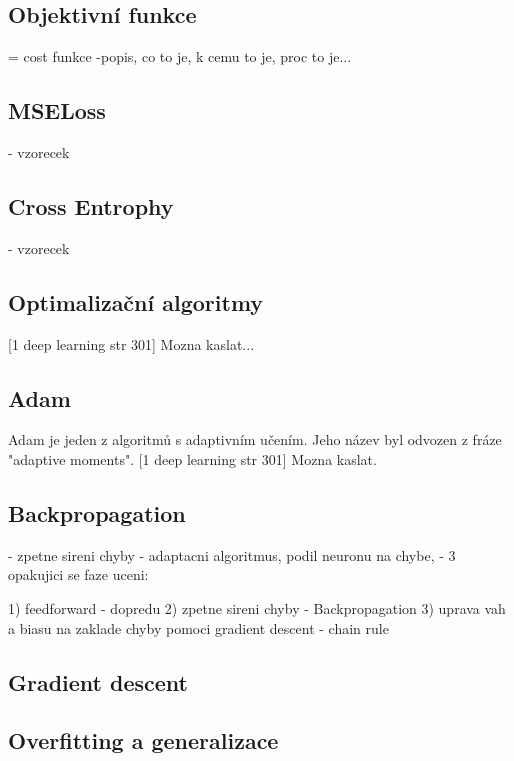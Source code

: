 \subsection{Objektivní funkce}
= cost funkce
-popis, co to je, k cemu to je, proc to je...

\subsection*{MSELoss}
- vzorecek
\subsection*{Cross Entrophy}
- vzorecek


\subsection{Optimalizační algoritmy}
 [1 deep learning str 301]
 Mozna kaslat...

\subsection*{Adam}
Adam je jeden z algoritmů s adaptivním učením. Jeho název byl odvozen z fráze "adaptive moments".  [1 deep learning str 301]
Mozna kaslat.


\subsection{Backpropagation}
- zpetne sireni chyby
- adaptacni algoritmus, podil neuronu na chybe,
- 3 opakujici se faze uceni:


1) feedforward - dopredu
2) zpetne sireni chyby - Backpropagation
3) uprava vah a biasu na zaklade chyby pomoci gradient descent
- chain rule



\subsection*{Gradient descent}

\subsection{Overfitting a generalizace}


